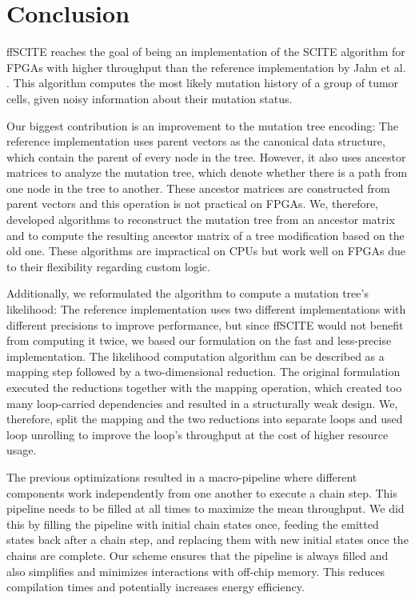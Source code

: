 \chapter{Conclusion}
\label{ch:conclusion}

\ac{ffSCITE} reaches the goal of being an implementation of the \ac{SCITE} algorithm for \acp{FPGA} with higher throughput than the reference implementation by Jahn et al. \cite{tree2016}. This algorithm computes the most likely mutation history of a group of tumor cells, given noisy information about their mutation status.

Our biggest contribution is an improvement to the mutation tree encoding: The reference implementation uses parent vectors as the canonical data structure, which contain the parent of every node in the tree. However, it also uses ancestor matrices to analyze the mutation tree, which denote whether there is a path from one node in the tree to another. These ancestor matrices are constructed from parent vectors and this operation is not practical on \acp{FPGA}. We, therefore, developed algorithms to reconstruct the mutation tree from an ancestor matrix and to compute the resulting ancestor matrix of a tree modification based on the old one. These algorithms are impractical on \acp{CPU} but work well on \acp{FPGA} due to their flexibility regarding custom logic.

Additionally, we reformulated the algorithm to compute a mutation tree's likelihood: The reference implementation uses two different implementations with different precisions to improve performance, but since \ac{ffSCITE} would not benefit from computing it twice, we based our formulation on the fast and less-precise implementation. The likelihood computation algorithm can be described as a mapping step followed by a two-dimensional reduction. The original formulation executed the reductions together with the mapping operation, which created too many loop-carried dependencies and resulted in a structurally weak design. We, therefore, split the mapping and the two reductions into separate loops and used loop unrolling to improve the loop's throughput at the cost of higher resource usage.

The previous optimizations resulted in a macro-pipeline where different components work independently from one another to execute a chain step. This pipeline needs to be filled at all times to maximize the mean throughput. We did this by filling the pipeline with initial chain states once, feeding the emitted states back after a chain step, and replacing them with new initial states once the chains are complete. Our scheme ensures that the pipeline is always filled and also simplifies and minimizes interactions with off-chip memory. This reduces compilation times and potentially increases energy efficiency.

